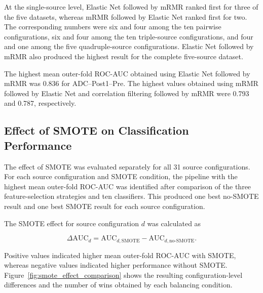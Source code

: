 \documentclass[12pt,twocolumn]{article}
\begin{document}
At the single-source level, Elastic Net followed by mRMR ranked first
for three of the five datasets, whereas mRMR followed by Elastic Net
ranked first for two. The corresponding numbers were six and four
among the ten pairwise configurations, six and four among the ten
triple-source configurations, and four and one among the five
quadruple-source configurations. Elastic Net followed by mRMR also
produced the highest result for the complete five-source dataset.

The highest mean outer-fold ROC-AUC obtained using Elastic Net
followed by mRMR was 0.836 for ADC--Post1--Pre. The highest values
obtained using mRMR followed by Elastic Net and correlation filtering
followed by mRMR were 0.793 and 0.787, respectively.















\subsection{Effect of SMOTE on Classification Performance}
\label{subsec:smote_results}

The effect of SMOTE was evaluated separately for all 31 source
configurations. For each source configuration and SMOTE condition,
the pipeline with the highest mean outer-fold ROC-AUC was identified
after comparison of the three feature-selection strategies and ten
classifiers. This produced one best no-SMOTE result and one best
SMOTE result for each source configuration.

The SMOTE effect for source configuration \(d\) was calculated as

\[
\Delta\mathrm{AUC}_{d}
=
\mathrm{AUC}_{d,\mathrm{SMOTE}}
-
\mathrm{AUC}_{d,\mathrm{no\text{-}SMOTE}}.
\]

Positive values indicated higher mean outer-fold ROC-AUC with SMOTE,
whereas negative values indicated higher performance without SMOTE.
Figure~\ref{fig:smote_effect_comparison} shows the resulting
configuration-level differences and the number of wins obtained by
each balancing condition.
\end{document}
